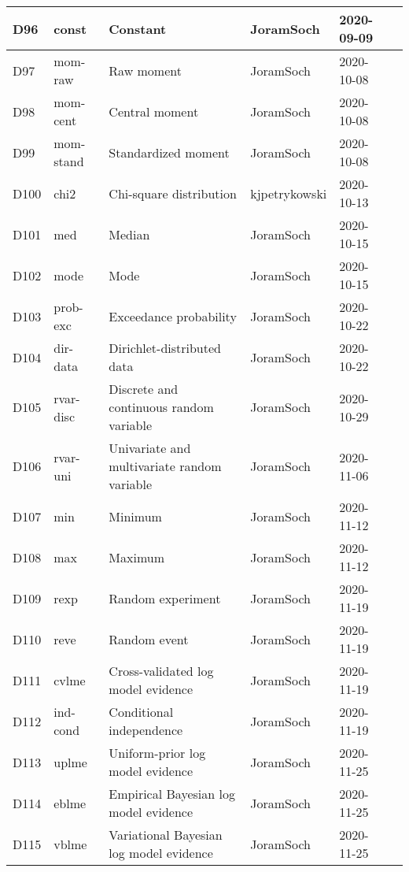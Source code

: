 \documentclass[a4paper,12pt,twoside]{book}
\begin{document}
\begin{longtable}{|p{1cm}|p{2cm}|p{6.5cm}|p{3cm}|p{2cm}|c|}
D96 & const & Constant & JoramSoch & 2020-09-09 & \pageref{sec:const} \\ \hline
D97 & mom-raw & Raw moment & JoramSoch & 2020-10-08 & \pageref{sec:mom-raw} \\ \hline
D98 & mom-cent & Central moment & JoramSoch & 2020-10-08 & \pageref{sec:mom-cent} \\ \hline
D99 & mom-stand & Standardized moment & JoramSoch & 2020-10-08 & \pageref{sec:mom-stand} \\ \hline
D100 & chi2 & Chi-square distribution & kjpetrykowski & 2020-10-13 & \pageref{sec:chi2} \\ \hline
D101 & med & Median & JoramSoch & 2020-10-15 & \pageref{sec:med} \\ \hline
D102 & mode & Mode & JoramSoch & 2020-10-15 & \pageref{sec:mode} \\ \hline
D103 & prob-exc & Exceedance probability & JoramSoch & 2020-10-22 & \pageref{sec:prob-exc} \\ \hline
D104 & dir-data & Dirichlet-distributed data & JoramSoch & 2020-10-22 & \pageref{sec:dir-data} \\ \hline
D105 & rvar-disc & Discrete and continuous random variable & JoramSoch & 2020-10-29 & \pageref{sec:rvar-disc} \\ \hline
D106 & rvar-uni & Univariate and multivariate random variable & JoramSoch & 2020-11-06 & \pageref{sec:rvar-uni} \\ \hline
D107 & min & Minimum & JoramSoch & 2020-11-12 & \pageref{sec:min} \\ \hline
D108 & max & Maximum & JoramSoch & 2020-11-12 & \pageref{sec:max} \\ \hline
D109 & rexp & Random experiment & JoramSoch & 2020-11-19 & \pageref{sec:rexp} \\ \hline
D110 & reve & Random event & JoramSoch & 2020-11-19 & \pageref{sec:reve} \\ \hline
D111 & cvlme & Cross-validated log model evidence & JoramSoch & 2020-11-19 & \pageref{sec:cvlme} \\ \hline
D112 & ind-cond & Conditional independence & JoramSoch & 2020-11-19 & \pageref{sec:ind-cond} \\ \hline
D113 & uplme & Uniform-prior log model evidence & JoramSoch & 2020-11-25 & \pageref{sec:uplme} \\ \hline
D114 & eblme & Empirical Bayesian log model evidence & JoramSoch & 2020-11-25 & \pageref{sec:eblme} \\ \hline
D115 & vblme & Variational Bayesian log model evidence & JoramSoch & 2020-11-25 & \pageref{sec:vblme} \\ \hline

\end{longtable}
\end{document}
